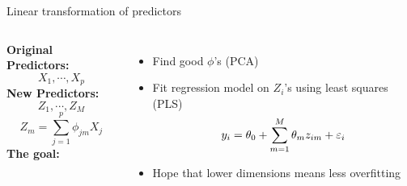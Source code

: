 \documentclass[aspectratio=169,usenames,dvipsnames]{beamer}
\begin{document}
\begin{frame}[t]{Linear transformation of predictors }

\begin{columns}
\centering
\textbf{Original Predictors:}
\begin{equation*}
	X_1,\cdots,X_p
\end{equation*}
\textbf{New Predictors:}
\begin{equation*}
	Z_1,\cdots,Z_M
\end{equation*}
\begin{equation*}
	Z_m = \sum_{j=1}^p \phi_{jm}X_j
\end{equation*}
\centering
\textbf{The goal:}
\begin{itemize}
\item Find good $\phi$'s (PCA)
\item Fit regression model on $Z_i$'s using least squares (PLS)
\begin{equation*}
	y_i = \theta_0 + \sum_{m=1}^M \theta_m z_{im} + \varepsilon_i
\end{equation*}
\item Hope that lower dimensions means less overfitting
\end{itemize}
\end{columns}

\end{frame}


\end{document}
